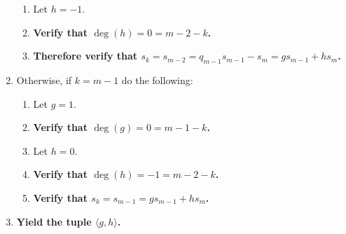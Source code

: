 \documentclass{article}
\begin{document}
\begin{multicols}{2}
\begin{enumerate}
\begin{enumerate}
						\item Let $h=-1$.
						\item \textbf{Verify that $\deg(h)=0=m-2-k$.}
						\item \textbf{Therefore verify that $s_k=s_{m-2}=q_{m-1}s_{m-1}-s_m=gs_{m-1}+hs_m$.}
					\end{enumerate}
					\item Otherwise, if $k=m-1$ do the following:
					\begin{enumerate}
						\item Let $g=1$.
						\item \textbf{Verify that $\deg(g)=0=m-1-k$.}
						\item Let $h=0$.
						\item \textbf{Verify that $\deg(h)=-1=m-2-k$.}
						\item \textbf{Verify that $s_k=s_{m-1}=gs_{m-1}+hs_m$.}
					\end{enumerate}
					\item \textbf{Yield the tuple $\langle g,h\rangle$.}
				\end{enumerate}
	\end{multicols}
	\clearpage
\end{document}
